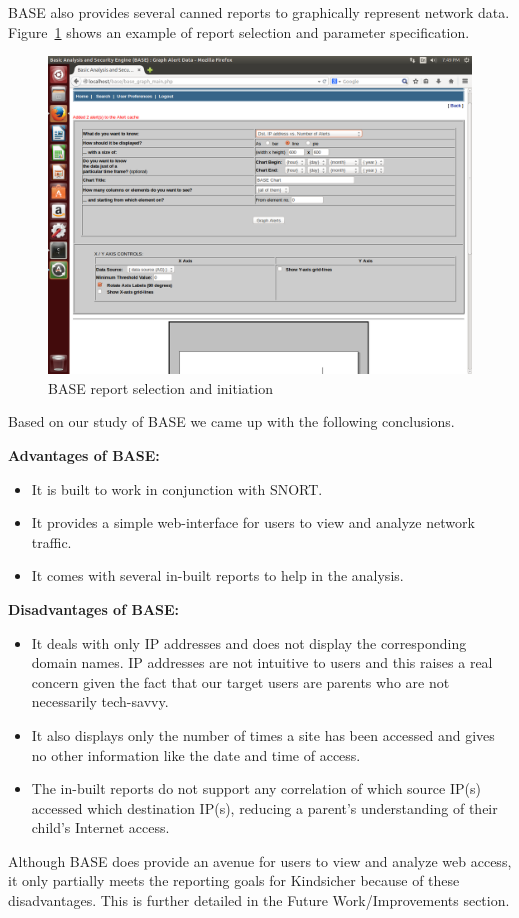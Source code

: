 BASE also provides several canned reports to graphically represent
network data. Figure~\ref{fig:r4} shows an example of report selection and
parameter specification.

\begin{figure}[!t]
    \centering
    \includegraphics[width=\columnwidth]{figures/R4_BASE_Report}
    \caption{BASE report selection and initiation}
    \label{fig:r4}
\end{figure}

Based on our study of BASE we came up with the following conclusions.

\textbf{Advantages of BASE:}
\begin{itemize}

\item It is built to work in conjunction with SNORT.

\item It provides a simple web-interface for users to view and
  analyze network traffic.

\item It comes with several in-built reports to help in the analysis.

\end{itemize}

\textbf{Disadvantages of BASE:}
\begin{itemize}

\item It deals with only IP addresses and does not display the
  corresponding domain names.
  IP addresses are not intuitive to users and this raises a real
  concern given the fact that our target users are parents who are not
  necessarily tech-savvy.

\item It also displays only the number of times a site has been
  accessed and gives no other information like the date and time of
  access.

\item The in-built reports do not support any correlation of which
  source IP(s) accessed which destination IP(s), reducing a parent's
  understanding of their child's Internet access.

\end{itemize}

Although BASE does provide an avenue for users to view and analyze web
access, it only partially meets the reporting goals for
Kindsicher because of these disadvantages.
%
This is further detailed in the Future Work/Improvements section.
%



